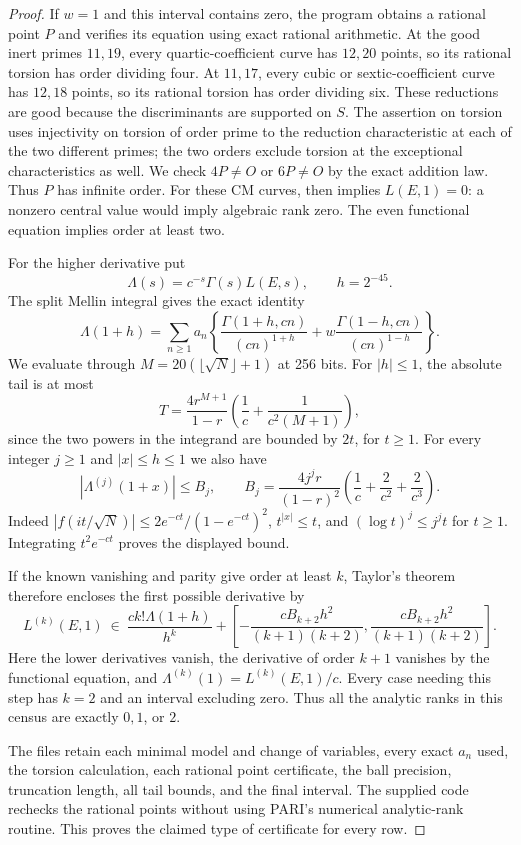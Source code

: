 \begin{proof}
If $w=1$ and this interval contains zero, the program obtains a rational
point $P$ and verifies its equation using exact rational arithmetic. At
the good inert primes $11,19$, every quartic-coefficient curve has
$12,20$ points, so its rational torsion has order dividing four. At
$11,17$, every cubic or sextic-coefficient curve has $12,18$ points, so
its rational torsion has order dividing six. These reductions are good
because the discriminants are supported on $S$. The assertion on torsion
uses injectivity on torsion of order prime to the reduction characteristic
at each of the two different primes; the two orders exclude torsion at
the exceptional characteristics as well. We check $4P\ne O$ or $6P\ne O$
by the exact addition law. Thus $P$ has infinite order.
For these CM curves, \citet[Corollary C and Remark (3), pp.527--528]{AMRubin1987}
then implies $L(E,1)=0$: a nonzero central value would imply algebraic
rank zero. The even functional equation implies order at least two.

For the higher derivative put
\[
 \Lambda(s)=c^{-s}\Gamma(s)L(E,s),\qquad h=2^{-45}.
\]
The split Mellin integral gives the exact identity
\[
 \Lambda(1+h)=\sum_{n\geq1}a_n\left\{
 \frac{\Gamma(1+h,cn)}{(cn)^{1+h}}+
 w\frac{\Gamma(1-h,cn)}{(cn)^{1-h}}\right\}.
\]
We evaluate through $M=20(\lfloor\sqrt N\rfloor+1)$ at 256 bits. For
$|h|\leq1$, the absolute tail is at most
\[
 T=\frac{4r^{M+1}}{1-r}
       \left(\frac1c+\frac1{c^2(M+1)}\right),
\]
since the two powers in the integrand are bounded by $2t$, for $t\geq1$.
For every integer $j\geq1$ and $|x|\leq h\leq1$ we also have
\[
 |\Lambda^{(j)}(1+x)|\leq B_j,
 \qquad
 B_j=\frac{4j^j r}{(1-r)^2}
       \left(\frac1c+\frac2{c^2}+\frac2{c^3}\right).
\]
Indeed $|f(it/\sqrt N)|\leq2e^{-ct}/(1-e^{-ct})^2$,
$t^{|x|}\leq t$, and $(\log t)^j\leq j^j t$ for $t\geq1$.
Integrating $t^2e^{-ct}$ proves the displayed bound.

If the known vanishing and parity give order at least $k$, Taylor's
theorem therefore encloses the first possible derivative by
\[
 L^{(k)}(E,1)\ \in\
 \frac{c k!\Lambda(1+h)}{h^k}
 +\left[-\frac{cB_{k+2}h^2}{(k+1)(k+2)},
         \frac{cB_{k+2}h^2}{(k+1)(k+2)}\right].
\]
Here the lower derivatives vanish, the derivative of order $k+1$ vanishes
by the functional equation, and $\Lambda^{(k)}(1)=L^{(k)}(E,1)/c$.
Every case needing this step has $k=2$ and an interval excluding zero.
Thus all the analytic ranks in this census are exactly $0,1$, or $2$.

The files retain each minimal model and change of variables, every exact
$a_n$ used, the torsion calculation, each rational point certificate,
the ball precision, truncation length, all tail bounds, and the final
interval. The supplied code rechecks the rational points without using
PARI's numerical analytic-rank routine. This proves the claimed type of
certificate for every row.
\end{proof}

